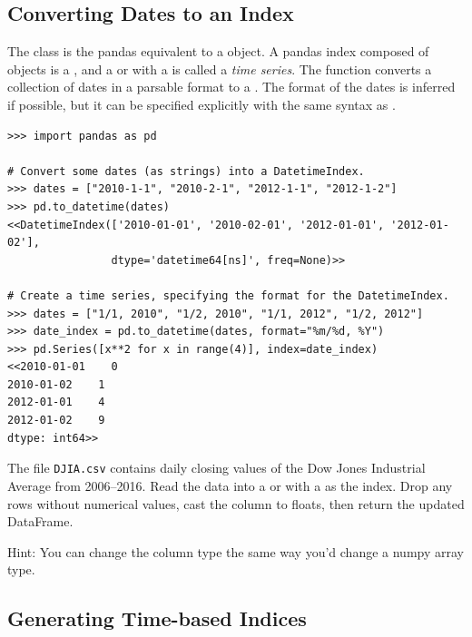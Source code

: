 \subsection*{Converting Dates to an Index} %

The  class is the pandas equivalent to a  object.
A pandas index composed of  objects is a , and a  or  with a  is called a \emph{time series}.
The function  converts a collection of dates in a parsable format to a .
The format of the dates is inferred if possible, but it can be specified explicitly with the same syntax as .

\begin{lstlisting}
>>> import pandas as pd

# Convert some dates (as strings) into a DatetimeIndex.
>>> dates = ["2010-1-1", "2010-2-1", "2012-1-1", "2012-1-2"]
>>> pd.to_datetime(dates)
<<DatetimeIndex(['2010-01-01', '2010-02-01', '2012-01-01', '2012-01-02'],
                dtype='datetime64[ns]', freq=None)>>

# Create a time series, specifying the format for the DatetimeIndex.
>>> dates = ["1/1, 2010", "1/2, 2010", "1/1, 2012", "1/2, 2012"]
>>> date_index = pd.to_datetime(dates, format="%m/%d, %Y")
>>> pd.Series([x**2 for x in range(4)], index=date_index)
<<2010-01-01    0
2010-01-02    1
2012-01-01    4
2012-01-02    9
dtype: int64>>
\end{lstlisting}

\begin{problem} %
The file \texttt{DJIA.csv} contains daily closing values of the Dow Jones Industrial Average from 2006--2016.
Read the data into a  or  with a  as the index.
Drop any rows without numerical values, cast the  column to floats, then return the updated DataFrame.

Hint: You can change the column type the same way you'd change a numpy array type.
\label{prob:timeseries-dowjones}
\end{problem}

\subsection*{Generating Time-based Indices} %

